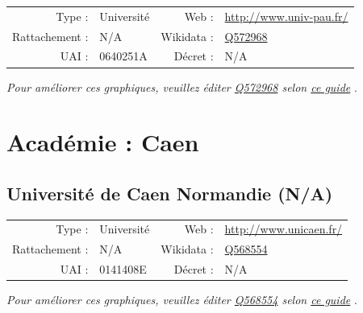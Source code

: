 \documentclass[12pt,french,landscape]{article}
\begin{document}
\begin{tabular*}{0.45\textwidth}{rp{2cm}rl}  
\hline  
Type : & Université & Web : &\href{http://www.univ-pau.fr/}{http://www.univ-pau.fr/} \\  
Rattachement : & N/A & Wikidata : & \href{https://www.wikidata.org/entity/Q572968}{Q572968} \\  
UAI : & 0640251A & Décret : & N/A \\  
\hline  
\end{tabular*}

\textit{\scriptsize Pour améliorer ces graphiques, veuillez éditer \href{https://www.wikidata.org/entity/Q572968}{Q572968}  selon \href{https://github.com/cpesr/wikidataESR/blob/master/Rmd/wikidataESR.md}{ce guide}}
.


\newpage

\hypertarget{acaduxe9mie-caen}{%
\section{Académie : Caen}\label{acaduxe9mie-caen}}

\hypertarget{universituxe9-de-caen-normandie-na}{%
\subsection{Université de Caen Normandie
(N/A)}\label{universituxe9-de-caen-normandie-na}}

\begin{tabular*}{0.45\textwidth}{rp{2cm}rl}  
\hline  
Type : & Université & Web : &\href{http://www.unicaen.fr/}{http://www.unicaen.fr/} \\  
Rattachement : & N/A & Wikidata : & \href{https://www.wikidata.org/entity/Q568554}{Q568554} \\  
UAI : & 0141408E & Décret : & N/A \\  
\hline  
\end{tabular*}

\textit{\scriptsize Pour améliorer ces graphiques, veuillez éditer \href{https://www.wikidata.org/entity/Q568554}{Q568554}  selon \href{https://github.com/cpesr/wikidataESR/blob/master/Rmd/wikidataESR.md}{ce guide}}
.

\end{document}

